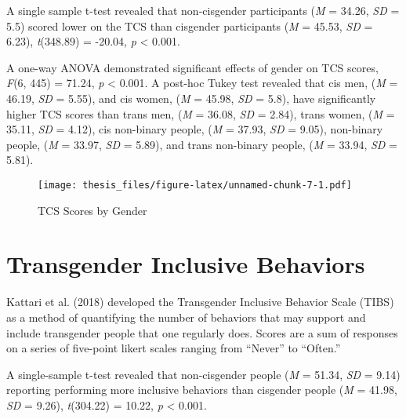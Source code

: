\documentclass[12pt,twoside]{reedthesis}
\begin{document}
A single sample t-test revealed that non-cisgender participants (\emph{M} = 34.26, \emph{SD} = 5.5) scored lower on the TCS than cisgender participants (\emph{M} = 45.53, \emph{SD} = 6.23), \emph{t}(348.89) = -20.04, \emph{p} \textless{} 0.001.

A one-way ANOVA demonstrated significant effects of gender on TCS scores, \emph{F}(6, 445) = 71.24, \emph{p} \textless{} 0.001. A post-hoc Tukey test revealed that cis men, (\emph{M} = 46.19, \emph{SD} = 5.55), and cis women, (\emph{M} = 45.98, \emph{SD} = 5.8), have significantly higher TCS scores than trans men, (\emph{M} = 36.08, \emph{SD} = 2.84), trans women, (\emph{M} = 35.11, \emph{SD} = 4.12), cis non-binary people, (\emph{M} = 37.93, \emph{SD} = 9.05), non-binary people, (\emph{M} = 33.97, \emph{SD} = 5.89), and trans non-binary people, (\emph{M} = 33.94, \emph{SD} = 5.81).
\begin{figure}
\centering
\texttt{[image: thesis\_files/figure-latex/unnamed-chunk-7-1.pdf]}
\caption{\label{fig:unnamed-chunk-7}TCS Scores by Gender}
\end{figure}
\hypertarget{transgender-inclusive-behaviors}{%
\section{Transgender Inclusive Behaviors}\label{transgender-inclusive-behaviors}}

Kattari et al. (2018) developed the Transgender Inclusive Behavior Scale (TIBS) as a method of quantifying the number of behaviors that may support and include transgender people that one regularly does. Scores are a sum of responses on a series of five-point likert scales ranging from ``Never'' to ``Often.''

A single-sample t-test revealed that non-cisgender people (\emph{M} = 51.34, \emph{SD} = 9.14) reporting performing more inclusive behaviors than cisgender people (\emph{M} = 41.98, \emph{SD} = 9.26), \emph{t}(304.22) = 10.22, \emph{p} \textless{} 0.001.
\end{document}
